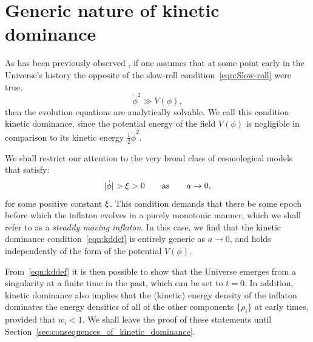 \section{Generic nature of kinetic dominance}
\label{sec:The_generic_nature_of_kinetic_dominance}

As has been previously observed \citep{Linde_initial_conditions_1985, belinsky_inflationary_1985,particle_astrophysics_1990}, if one assumes that at some point early in the Universe's history the opposite of the slow-roll condition~\eqref{eqn:Slow-roll} were true,
%
\begin{equation}
  \dot\phi^2\gg V(\phi),
  \label{eqn:kddef}
\end{equation}
%
then the evolution equations are analytically solvable.  We call this condition kinetic dominance, since the potential energy of the field $V(\phi)$ is negligible in comparison to its kinetic energy $\frac{1}{2}\dot\phi^2$.

We shall restrict our attention to the very broad class of cosmological models that satisfy:
%
\begin{equation}
|\dot{\phi}| > \xi > 0 \qquad \text{as} \qquad a\to 0, 
\label{eqn:conditions}
\end{equation}
%
for some positive constant $\xi$.  This condition demands that there be some epoch before which the inflaton evolves in a purely monotonic manner, which we shall refer to as a {\em steadily moving inflaton}. In this case, we find that the kinetic dominance condition~\eqref{eqn:kddef} is entirely generic as $a \to 0$, and holds independently of the form of the potential $V(\phi)$.

From~\eqref{eqn:kddef} it is then possible to show that the Universe emerges from a singularity at a finite time in the past, which can be set to $t=0$. In addition, kinetic dominance also implies that the (kinetic) energy density of the inflaton dominates the energy densities of all of the other components $\{\rho_i\}$ at early times, provided that $w_i<1$. We shall leave the proof of these statements until Section~\ref{sec:consequences_of_kinetic_dominance}. 

